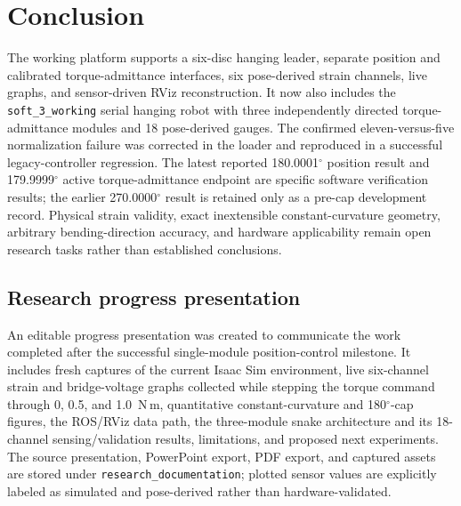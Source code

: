 \documentclass[11pt,letterpaper]{article}
\newcommand{\degrees}{\ensuremath{^{\circ}}}
\begin{document}
\section{Conclusion}
The working platform supports a six-disc hanging leader, separate position
and calibrated torque-admittance interfaces, six pose-derived strain channels,
live graphs, and sensor-driven RViz reconstruction. It now also includes the
\texttt{soft\_3\_working} serial hanging robot with three independently
directed torque-admittance modules and 18 pose-derived gauges. The confirmed eleven-versus-five
normalization failure was corrected in the loader and reproduced in a
successful legacy-controller regression. The latest reported 180.0001\degrees{}
position result and 179.9999\degrees{} active torque-admittance endpoint are
specific software verification results; the earlier 270.0000\degrees{} result
is retained only as a pre-cap development record. Physical
strain validity, exact inextensible constant-curvature geometry, arbitrary
bending-direction accuracy, and hardware applicability remain open research
tasks rather than established conclusions.

\subsection{Research progress presentation}
An editable progress presentation was created to communicate the work completed
after the successful single-module position-control milestone. It includes
fresh captures of the current Isaac Sim environment, live six-channel strain
and bridge-voltage graphs collected while stepping the torque command through
0, 0.5, and 1.0~N\,m, quantitative constant-curvature and 180\degrees{}-cap
figures, the ROS/RViz data path, the three-module snake architecture and its
18-channel sensing/validation results, limitations, and proposed next experiments.
The source presentation, PowerPoint export, PDF export, and captured assets are
stored under \texttt{research\_documentation}; plotted sensor values are
explicitly labeled as simulated and pose-derived rather than hardware-validated.
\end{document}
